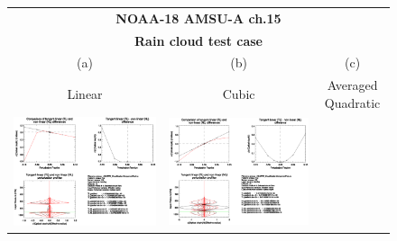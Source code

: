 \begin{figure}[htp]
  \centering
  \begin{tabular}{c c c}
    \multicolumn{3}{c}{\qquad\sffamily\textbf{NOAA-18 AMSU-A ch.15}}\\
    \multicolumn{3}{c}{\qquad\sffamily\textbf{Rain cloud test case}}\\
    \qquad\textsf{(a)} & \qquad\textsf{(b)}  & \qquad\textsf{(c)} \\
    \qquad\textsf{Linear} & \qquad\textsf{Cubic}  & \qquad\textsf{Averaged Quadratic} \\
    \includegraphics[bb=90 400 300 540,clip,scale=0.7]{graphics/Cloud/TL/amsua_n18.ch15.RAIN.NLIN.dOd_dReff.eps} &
    \includegraphics[bb=90 400 300 540,clip,scale=0.7]{graphics/Cloud/TL/amsua_n18.ch15.RAIN.NCUBIC.dOd_dReff.eps} &

\end{tabular}
\end{figure}
